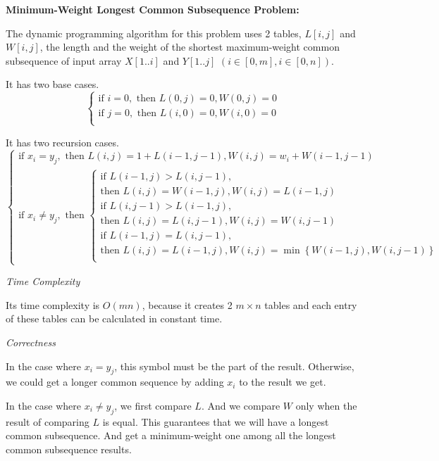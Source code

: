 \documentclass[12pt,letterpaper]{article}
\begin{document}
\medskip
\noindent\textbf{Minimum-Weight Longest Common Subsequence Problem:}\par
The dynamic programming algorithm for this problem uses 2 tables, $L[i, j]$ and $W[i, j]$, the length and the weight of the shortest maximum-weight common subsequence of input array $X[1..i]$ and $Y[1..j]$ $(i\in[0,m], i\in[0,n])$.\par
It has two base cases.
\[
	\begin{cases}
		\text{if } i=0, \text{ then } L(0,j)=0, W(0,j)=0\\
		\text{if } j=0, \text{ then } L(i,0)=0, W(i,0)=0\\
	\end{cases}
\]\par
It has two recursion cases.
\[
	\begin{cases}
		\text{if } x_i=y_j, \text{ then } L(i,j)=1+L(i-1, j-1), W(i,j)=w_i+W(i-1, j-1)\\
		\text{if } x_i\neq y_j, \text{ then } 
		\begin{cases}
			\text{if } L(i-1,j) > L(i,j-1),\\
			\text{then } L(i,j)=W(i-1,j), W(i,j)=L(i-1,j)\\
			\text{if } L(i,j-1) > L(i-1,j),\\
			\text{then } L(i,j)=L(i,j-1), W(i,j)=W(i,j-1)\\
			\text{if } L(i-1,j) = L(i,j-1),\\
			\text{then } L(i,j)=L(i-1,j), W(i,j)=\min\left\{W(i-1,j), W(i,j-1)\right\}\\
		\end{cases}
	\end{cases}
\]\par
\medskip\noindent\textit{Time Complexity}\par
Its time complexity is $O(mn)$, because it creates 2 $m\times n$ tables and each entry of these tables can be calculated in constant time.\par
\medskip\noindent\textit{Correctness}\par
In the case where $x_i=y_j$, this symbol must be the part of the result. Otherwise, we could get a longer common sequence by adding $x_i$ to the result we get.\par
In the case where $x_i\neq y_j$, we first compare $L$. And we compare $W$ only when the result of comparing $L$ is equal. This guarantees that we will have a longest common subsequence. And get a minimum-weight one among all the longest common subsequence results.\par
\end{document}
